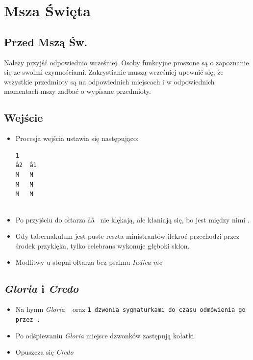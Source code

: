 \section{Msza Święta}

\subsection{Przed Mszą Św.}

Należy przyjść odpowiednio wcześniej. Osoby funkcyjne proszone są o zapoznanie
się ze swoimi czynnościami. Zakrystianie muszą wcześniej upewnić się, że
wszystkie przedmioty są na odpowiednich miejscach i w odpowiednich momentach
mszy zadbać o wypisane przedmioty.

\subsection{Wejście}

\begin{itemize}
      \item Procesja wejścia ustawia się następująco:
            \begin{center}
                  \tt1~~~\smallskip\\
                  \aa2~~\aa1\smallskip\\
                  M~~~M\smallskip\\
                  M~~~M\smallskip\\
                  M~~~M\smallskip\\
                  \smallskip\\
                  \ii
            \end{center}
      \item Po przyjściu do ołtarza \aa\aa~ nie klękają, ale kłaniają się, bo jest
            między nimi .
      \item Gdy tabernakulum jest puste reszta ministrantów ilekroć przechodzi
            przez środek przyklęka, tylko celebrans wykonuje głęboki skłon.
      \item Modlitwy u stopni ołtarza bez psalmu \textit{Iudica me}
\end{itemize}

\subsection{\textit{Gloria} i \textit{Credo}}

\begin{itemize}
      \item Na hymn \textit{Gloria} \zz~ oraz \tt1 dzwonią sygnaturkami do czasu
            odmówienia go przez \ii.
      \item Po odśpiewaniu \textit{Gloria} miejsce dzwonków zastępują kołatki.
      \item Opuszcza się \textit{Credo}
\end{itemize}

